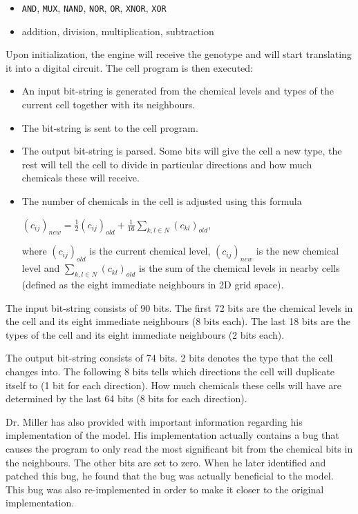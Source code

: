 \begin{itemize}
	\itemsep=0pt
	\item \texttt{AND}, \texttt{MUX}, \texttt{NAND}, \texttt{NOR}, \texttt{OR}, \texttt{XNOR}, \texttt{XOR}
	\item addition, division, multiplication, subtraction
\end{itemize}

\noindent Upon initialization, the engine will receive the genotype and will start translating it into a digital circuit. The cell program is then executed:

\begin{itemize}
	\itemsep=0pt
	\item An input bit-string is generated from the chemical levels and types of the current cell together with its neighbours.
	\item The bit-string is sent to the cell program.
	\item The output bit-string is parsed. Some bits will give the cell a new type, the rest will tell the cell to divide in particular directions and how much chemicals these will receive.
	\item The number of chemicals in the cell is adjusted using this formula

	$(c_{ij})_{new} = \frac{1}{2}(c_{ij})_{old} + \frac{1}{16}\sum_{k, l \in N} (c_{kl})_{old}$,

	where $(c_{ij})_{old}$ is the current chemical level, $(c_{ij})_{new}$ is the new chemical level and $\sum_{k, l \in N} (c_{kl})_{old}$ is the sum of the chemical levels in nearby cells (defined as the eight immediate neighbours in 2D grid space).
\end{itemize}

The input bit-string consists of 90 bits. The first 72 bits are the chemical levels in the cell and its eight immediate neighbours (8 bits each). The last 18 bits are the types of the cell and its eight immediate neighbours (2 bits each).

The output bit-string consists of 74 bits. 2 bits denotes the type that the cell changes into. The following 8 bits tells which directions the cell will duplicate itself to (1 bit for each direction). How much chemicals these cells will have are determined by the last 64 bits (8 bits for each direction).

Dr. Miller has also provided with important information regarding his implementation of the model. His implementation actually contains a bug that causes the program to only read the most significant bit from the chemical bits in the neighbours. The other bits are set to zero. When he later identified and patched this bug, he found that the bug was actually beneficial to the model. This bug was also re-implemented in order to make it closer to the original implementation.
